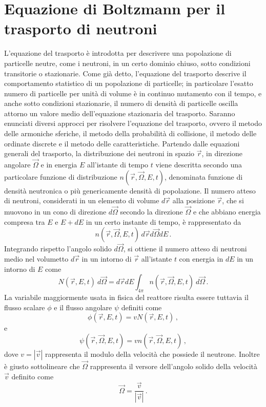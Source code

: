 \section{Equazione di Boltzmann per il trasporto di neutroni}
L'equazione del trasporto è introdotta per descrivere una popolazione di 
particelle neutre, come i neutroni, in un certo dominio chiuso, sotto condizioni 
transitorie o stazionarie.
Come già detto, l'equazione del trasporto descrive il comportamento statistico 
di un popolazione di particelle; in particolare l'esatto numero di particelle 
per unità di volume è in continuo mutamento con il tempo, e anche sotto 
condizioni stazionarie, il numero di densità di particelle oscilla attorno un 
valore medio dell'equazione stazionaria del trasporto.
Saranno enunciati diversi approcci per risolvere l'equazione del trasporto, 
ovvero il metodo delle armoniche sferiche, il metodo della probabilità di 
collisione, il metodo delle ordinate discrete e il metodo delle caratteristiche.
Partendo dalle equazioni generali del trasporto, la distribuzione dei neutroni 
in spazio $\vec{r}$, in direzione angolare $\vec{\Omega}$ e in energia $E$ 
all'istante di tempo $t$ viene descritta secondo una particolare funzione di 
distribuzione $n(\vec{r},\vec{\Omega},E,t)$, denominata funzione di densità 
neutronica o più genericamente densità di popolazione. 
Il numero atteso di neutroni, considerati in un elemento di volume $d\vec{r}$ 
alla posizione $\vec{r}$, che si muovono in un cono di direzione $d\vec{\Omega}$ 
secondo la direzione $\vec{\Omega}$ e che abbiano energia compresa tra $E$ e 
$E+dE$ in un certo instante di tempo, è rappresentato da
\begin{equation}
n(\vec{r},\vec{\Omega},E,t)\, d\vec{r}d\vec{\Omega}dE \,.
\end{equation}
Integrando rispetto l'angolo solido $d\vec{\Omega}$, si ottiene il numero atteso 
di neutroni medio nel volumetto $d\vec{r}$ in un intorno di $\vec{r}$ 
all'istante $t$ con energia in $dE$ in un intorno di $E$ come
\begin{equation}
N(\vec{r},E,t) \: d\vec{\Omega} = 
d\vec{r}dE\int_{4\pi}n(\vec{r},\vec{\Omega},E,t) \: d\vec{\Omega} \,.
\end{equation}
La variabile maggiormente usata in fisica del reattore risulta essere tuttavia 
il flusso scalare $\phi$ e il flusso angolare $\psi$ definiti come
\begin{equation}
\phi(\vec{r},E,t) = v N(\vec{r},E,t) \,,
\end{equation}
e
\begin{equation}
\psi(\vec{r},\vec{\Omega},E,t)= v n(\vec{r},\vec{\Omega},E,t) \,,
\end{equation}
dove $v=|\vec{v}|$ rappresenta il modulo della velocità che possiede il 
neutrone. Inoltre è giusto sottolineare che $\vec{\Omega}$ rappresenta il 
versore dell'angolo solido della velocità $\vec{v}$ definito come
\begin{equation}
\vec{\Omega}=\frac{\vec{v}}{|\vec{v}|} \,.
\end{equation}


